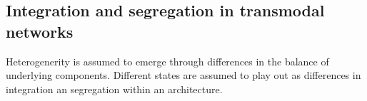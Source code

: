 

\subsection{Integration and segregation in transmodal networks}

Heterogenerity is assumed to emerge through differences in the balance of underlying components. Different states are assumed to play out as differences in integration an segregation within an architecture. 

